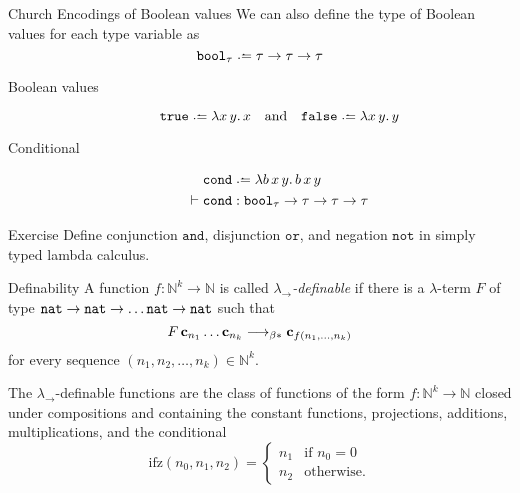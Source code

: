 \begin{frame}{Church Encodings of Boolean values}
We can also define the type of Boolean values 
for each type variable as
\[
  \bool_\tau \defeq \tau \to \tau \to \tau
\]
\begin{description}
  \item[Boolean values]
      \[
        \true \defeq \lambda x\,y.\,x 
        \quad\text{and}\quad
        \false \defeq \lambda x\,y.\,y 
      \]
  \item[Conditional]
    \begin{align*}
      & \cond \defeq \lambda b\,x\,y.\, b\,x\,y\\
      \vdash {} & \cond : \bool_{\tau} \to \tau \to \tau \to \tau
    \end{align*}
\end{description}
\begin{block}{Exercise}
  Define conjunction $\mathtt{and}$, disjunction $\mathtt{or}$, and negation
  $\mathtt{not}$ in simply typed lambda calculus.
\end{block}
\end{frame}

\begin{frame}{Definability}
  A function $f\colon \mathbb{N}^k \to \mathbb{N}$ is called
  \alert{\emph{$\lambda_\to$-definable}} if there is a $\lambda$-term $F$ of
  type $\mathtt{nat} \to \mathtt{nat} \to \dots \mathtt{nat} \to \mathtt{nat}$ such that
  \[
    F\,\mathbf{c}_{n_1}\ldots\mathbf{c}_{n_k} \longrightarrow_{\beta*} \mathbf{c}_{f(n_1, \dots, n_k)}
  \]
  for every sequence $(n_1, n_2, \ldots, n_k) \in \mathbb{N}^k$.

\begin{theorem}
  The $\lambda_\to$-definable functions are the class of functions
  of the form $f\colon \mathbb{N}^k \to \mathbb{N}$ closed under compositions
  and containing the constant functions, projections, additions, multiplications,
  and the conditional 
  \[
    \mathrm{ifz}(n_0, n_1, n_2) = 
    \begin{cases}
      n_1 & \text{if } n_0 = 0\\
      n_2 & \text{otherwise.}
    \end{cases}
  \]
\end{theorem}
\end{frame}

